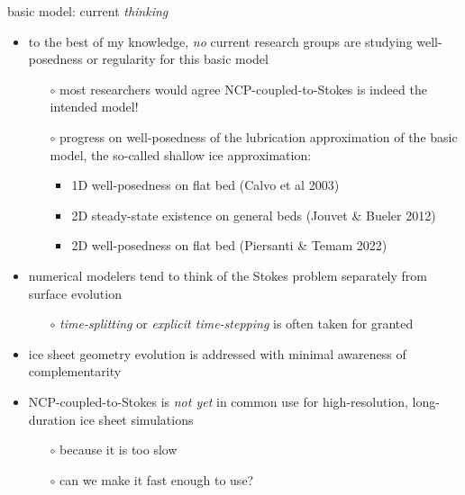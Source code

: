 \documentclass[svgnames,
               hyperref={colorlinks,citecolor=DeepPink4,linkcolor=FireBrick,urlcolor=Maroon},
               usepdftitle=false]  %
               {beamer}
\begin{document}
\begin{frame}{basic model: current \emph{thinking}}

\begin{itemize}
\item to the best of my knowledge, \emph{no} current research groups are studying well-posedness or regularity for this basic model
    \begin{itemize}
    \item[$\circ$] most researchers would agree NCP-coupled-to-Stokes is indeed the intended model!
    \item[$\circ$] progress on well-posedness of the lubrication approximation of the basic model, the so-called \alert{shallow ice approximation}:
        \begin{itemize}
        \item 1D well-posedness on flat bed (Calvo et al 2003)
        \item 2D steady-state existence on general beds (Jouvet \& Bueler 2012)
        \item 2D well-posedness on flat bed (Piersanti \& Temam 2022)
        \end{itemize}
    \end{itemize}

\medskip
\item numerical modelers tend to think of the Stokes problem separately from surface evolution
    \begin{itemize}
    \item[$\circ$] \emph{time-splitting} or \emph{explicit time-stepping} is often taken for granted
    \end{itemize}

\medskip
\item ice sheet geometry evolution is addressed with minimal awareness of complementarity

\medskip
\item NCP-coupled-to-Stokes is \emph{not yet} in common use for high-resolution, long-duration ice sheet simulations
    \begin{itemize}
    \item[$\circ$] because it is too slow
    \item[$\circ$] \alert{can we make it fast enough to use?}
    \end{itemize}
\end{itemize}
\end{frame}


\end{document}
